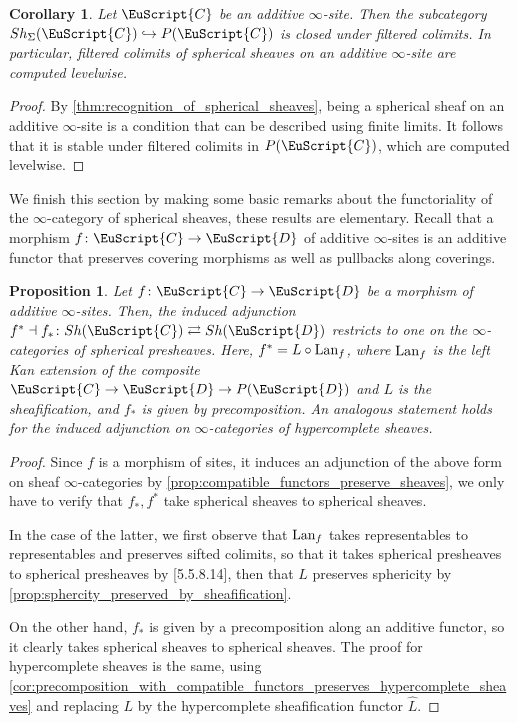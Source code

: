 \documentclass[oneside,a4paper]{amsart}
\newcommand{\euscr}[1]{\EuScript{#1}} %
\newcommand{\ccat}{\euscr{C}} %
\newcommand{\dcat}{\euscr{D}} %
\newcommand{\Lan}{\textnormal{Lan}} %
\theoremstyle{plain}
\newtheorem{prop}[thm]{Proposition}
\newtheorem{cor}[thm]{Corollary}
\theoremstyle{definition}
\theoremstyle{remark}
\begin{document}
\begin{cor}
\label{cor:filtered_colimits_in_spherical_sheaves_on_an_additive_site_computed_levelwise}
Let $\ccat$ be an additive $\infty$-site. Then the subcategory $Sh_{\Sigma}(\ccat) \hookrightarrow P(\ccat)$ is closed under filtered colimits. In particular, filtered colimits of spherical sheaves on an additive $\infty$-site are computed levelwise.
\end{cor}

\begin{proof}
By \cref{thm:recognition_of_spherical_sheaves}, being a spherical sheaf on an additive $\infty$-site is a condition that can be described using finite limits. It follows that it is stable under filtered colimits in $P(\ccat)$, which are computed levelwise. 
\end{proof}
We finish this section by making some basic remarks about the functoriality of the $\infty$-category of spherical sheaves, these results are elementary. Recall that a morphism $f \colon \ccat \rightarrow \dcat$ of additive $\infty$-sites is an additive functor that preserves covering morphisms as well as pullbacks along coverings. 

\begin{prop}
\label{prop:morphism_of_additive_infinity_sites_induces_an_adjunction_on_spherical_sheaf_infinity_categories}
Let $f \colon \ccat \rightarrow \dcat$ be a morphism of additive $\infty$-sites. Then, the induced adjunction $f^{*} \dashv f_{*} \colon Sh(\ccat) \rightleftarrows Sh(\dcat)$ restricts to one on the $\infty$-categories of spherical presheaves. Here, $f^{*} = L \circ \Lan_{f}$, where $\Lan_{f}$ is the left Kan extension of the composite $\ccat \rightarrow \dcat \rightarrow P(\dcat)$ and $L$ is the sheafification, and $f_{*}$ is given by precomposition. An analogous statement holds for the induced adjunction on $\infty$-categories of hypercomplete sheaves. 
\end{prop}

\begin{proof}
Since $f$ is a morphism of sites, it induces an adjunction of the above form on sheaf $\infty$-categories by \cref{prop:compatible_functors_preserve_sheaves}, we only have to verify that $f_{*}, f^{*}$ take spherical sheaves to spherical sheaves.

 In the case of the latter, we first observe that $\Lan_{f}$ takes representables to representables and preserves sifted colimits, so that it takes spherical presheaves to spherical presheaves by \cite{lurie_higher_topos_theory}[5.5.8.14], then that $L$ preserves sphericity by \cref{prop:sphercity_preserved_by_sheafification}. 

On the other hand, $f_{*}$ is given by a precomposition along an additive functor, so it clearly takes spherical sheaves to spherical sheaves. The proof for hypercomplete sheaves is the same, using \cref{cor:precomposition_with_compatible_functors_preserves_hypercomplete_sheaves} and replacing $L$ by the hypercomplete sheafification functor $\widehat{L}$. 
\end{proof}
\end{document}
